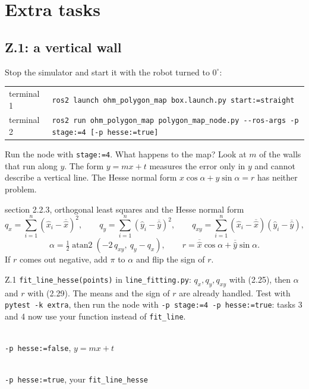 \documentclass[11pt,a4paper,parskip=half]{scrartcl}
\makeatletter
\newcommand{\thema}[1]{\texttt{#1}}
\newcommand{\datei}[1]{\texttt{#1}}
\newcommand{\running}[2]{\begin{tcolorbox}[base, colback=black!3, borderline west={2.5pt}{0pt}{ohmgrey},
        title={\faTerminal~Running}, coltitle=ohmgrey, colbacktitle=black!3, fonttitle=\small\bfseries,
        toptitle=2pt, bottomtitle=0pt, fontupper=\small]
  \begin{tabularx}{\linewidth}{@{}>{\color{ohmgrey}}l >{\raggedright\arraybackslash}X@{}}
    terminal 1 & \texttt{ros2 launch ohm\_polygon\_map box.launch.py#1} \\
    terminal 2 & \texttt{ros2 run ohm\_polygon\_map polygon\_map\_node.py -\kern0pt-ros-args #2}
  \end{tabularx}
\end{tcolorbox}}
\makeatother
\begin{document}
\newpage
\section{Extra tasks}
\label{sec:extra}

\subsection*{Z.1: a vertical wall}
Stop the simulator and start it with the robot turned to \(0^\circ\):
\running{ start:=straight}{-p stage:=4 \mbox{\textcolor{ohmgrey}{[-p hesse:=true]}}}
Run the node with \thema{stage:=4}. What happens to the map? Look at \(m\) of the walls that run along
\(y\). The form \(y = m x + t\) measures the error only in \(y\) and cannot describe a vertical line. The
Hesse normal form \(x\cos\alpha + y\sin\alpha = r\) has neither problem.

\begin{script}{section 2.2.3, orthogonal least squares and the Hesse normal form}
\begin{equation}
  q_x = \sum_{i=1}^n (\hat x_i - \overline{\hat x})^2, \qquad
  q_y = \sum_{i=1}^n (\hat y_i - \overline{\hat y})^2, \qquad
  q_{xy} = \sum_{i=1}^n (\hat x_i - \overline{\hat x})(\hat y_i - \overline{\hat y}),
  \tag{2.25}
\end{equation}
\begin{equation}
  \alpha = \tfrac12 \operatorname{atan2}\!\left(-2\,q_{xy},\ q_y - q_x\right), \qquad
  r = \overline{\hat x}\cos\alpha + \overline{\hat y}\sin\alpha .
  \tag{2.29}
\end{equation}
If \(r\) comes out negative, add \(\pi\) to \(\alpha\) and flip the sign of \(r\).
\end{script}

\begin{todo}{Z.1}
\thema{fit\_line\_hesse(points)} in \datei{line\_fitting.py}: \(q_x, q_y, q_{xy}\) with (2.25), then \(\alpha\)
and \(r\) with (2.29). The means and the sign of \(r\) are already handled. Test with \thema{pytest -k extra}, then run the node
with \thema{-p stage:=4 -p hesse:=true}: tasks 3 and 4 now use your function instead of \thema{fit\_line}.
\end{todo}

\begin{seebox}
  \centering
  \begin{minipage}[t]{0.4\linewidth}\centering
    \resizebox{\linewidth}{!}{}\\[2pt]
    {\small\thema{-p hesse:=false}, \(y = m x + t\)}
  \end{minipage}\hspace{0.05\linewidth}
  \begin{minipage}[t]{0.4\linewidth}\centering
    \resizebox{\linewidth}{!}{}\\[2pt]
    {\small\thema{-p hesse:=true}, your \thema{fit\_line\_hesse}}
  \end{minipage}
  \par{}
  
\end{seebox}
\end{document}
